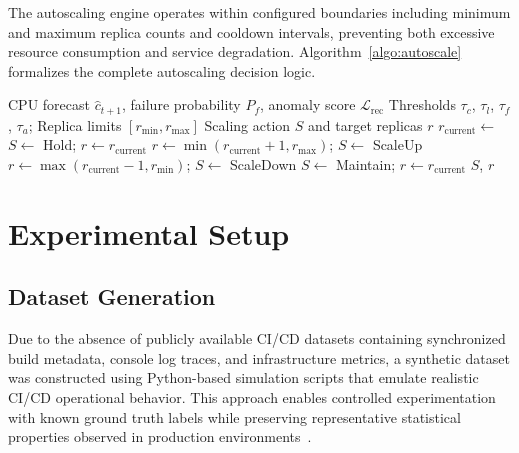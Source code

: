 \documentclass[sn-nature]{sn-jnl}
\theoremstyle{thmstyleone}
\theoremstyle{thmstyletwo}
\theoremstyle{thmstylethree}
\begin{document}
The autoscaling engine operates within configured boundaries including minimum and maximum replica counts and cooldown intervals, preventing both excessive resource consumption and service degradation. Algorithm~\ref{algo:autoscale} formalizes the complete autoscaling decision logic.

\begin{algorithm}[htbp]
\caption{Predictive Autoscaling Decision Algorithm}\label{algo:autoscale}
\begin{algorithmic}[1]
\Require CPU forecast $\hat{c}_{t+1}$, failure probability $P_f$, anomaly score $\mathcal{L}_{\mathrm{rec}}$
\Require Thresholds $\tau_c$, $\tau_l$, $\tau_f$, $\tau_a$; Replica limits $[r_{\mathrm{min}}, r_{\mathrm{max}}]$
\Ensure Scaling action $S$ and target replicas $r$
\State $r_{\mathrm{current}} \gets$ 
    \State {}
\EndIf
{}
    \State $S \gets$ \textrm{Hold}; $r \gets r_{\mathrm{current}}$
    \State $r \gets \min(r_{\mathrm{current}} + 1, r_{\mathrm{max}})$; $S \gets$ \textrm{ScaleUp}
    \State $r \gets \max(r_{\mathrm{current}} - 1, r_{\mathrm{min}})$; $S \gets$ \textrm{ScaleDown}
\Else
    \State $S \gets$ \textrm{Maintain}; $r \gets r_{\mathrm{current}}$
\EndIf
\State {}
\State \Return $S$, $r$
\end{algorithmic}
\end{algorithm}

\section{Experimental Setup}\label{sec:experimental}

\subsection{Dataset Generation}\label{subsec:dataset}

Due to the absence of publicly available CI/CD datasets containing synchronized build metadata, console log traces, and infrastructure metrics, a synthetic dataset was constructed using Python-based simulation scripts that emulate realistic CI/CD operational behavior. This approach enables controlled experimentation with known ground truth labels while preserving representative statistical properties observed in production environments~\cite{rausch2017empirical, beller2017oops}.
\end{document}

